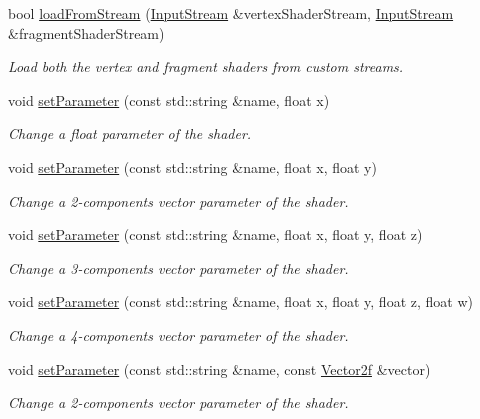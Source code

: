 \begin{DoxyCompactItemize}
bool \hyperlink{classsf_1_1Shader_a3b7958159ffb5596c4babc3052e35465}{load\-From\-Stream} (\hyperlink{classsf_1_1InputStream}{Input\-Stream} \&vertex\-Shader\-Stream, \hyperlink{classsf_1_1InputStream}{Input\-Stream} \&fragment\-Shader\-Stream)
\begin{DoxyCompactList}\small\item\em Load both the vertex and fragment shaders from custom streams. \end{DoxyCompactList}\item 
void \hyperlink{classsf_1_1Shader_a47e4dd78f0752ae08664b4ee616db1cf}{set\-Parameter} (const std\-::string \&name, float x)
\begin{DoxyCompactList}\small\item\em Change a float parameter of the shader. \end{DoxyCompactList}\item 
void \hyperlink{classsf_1_1Shader_ab8d379f40810b8e3eadebee81aedd231}{set\-Parameter} (const std\-::string \&name, float x, float y)
\begin{DoxyCompactList}\small\item\em Change a 2-\/components vector parameter of the shader. \end{DoxyCompactList}\item 
void \hyperlink{classsf_1_1Shader_a7e36e044d6b8adca8339f40c5a4b1801}{set\-Parameter} (const std\-::string \&name, float x, float y, float z)
\begin{DoxyCompactList}\small\item\em Change a 3-\/components vector parameter of the shader. \end{DoxyCompactList}\item 
void \hyperlink{classsf_1_1Shader_aeb468f1bc2d26750b96b74f1e19027fb}{set\-Parameter} (const std\-::string \&name, float x, float y, float z, float w)
\begin{DoxyCompactList}\small\item\em Change a 4-\/components vector parameter of the shader. \end{DoxyCompactList}\item 
void \hyperlink{classsf_1_1Shader_a3ac473ece2c6fa26dc5032c07fd7288e}{set\-Parameter} (const std\-::string \&name, const \hyperlink{classsf_1_1Vector2}{Vector2f} \&vector)
\begin{DoxyCompactList}\small\item\em Change a 2-\/components vector parameter of the shader. \end{DoxyCompactList}\item 

\end{DoxyCompactItemize}
